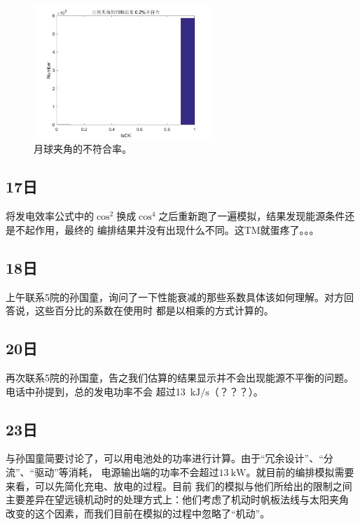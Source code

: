 \begin{figure}
\centering
\includegraphics[width=0.6\textwidth]{figs/check_results/moon_angle_disagreement.png}
\caption{月球夹角的不符合率。}
\label{0411_check_results7}
\end{figure}

\subsection{17日}
将发电效率公式中的$\cos^2$换成$\cos^4$之后重新跑了一遍模拟，结果发现能源条件还是不起作用，最终的
编排结果并没有出现什么不同。这TM就蛋疼了。。。

\subsection{18日}
上午联系5院的孙国童，询问了一下性能衰减的那些系数具体该如何理解。对方回答说，这些百分比的系数在使用时
都是以相乘的方式计算的。

\subsection{20日}
再次联系5院的孙国童，告之我们估算的结果显示并不会出现能源不平衡的问题。电话中孙提到，总的发电功率不会
超过13~$\text{kJ/s}$（？？？）。

\subsection{23日}
与孙国童简要讨论了，可以用电池处的功率进行计算。由于“冗余设计”、“分流”、“驱动”等消耗，
电源输出端的功率不会超过$13~\text{kW}$。就目前的编排模拟需要来看，可以先简化充电、放电的过程。目前
我们的模拟与他们所给出的限制之间主要差异在望远镜机动时的处理方式上：他们考虑了机动时帆板法线与太阳夹角
改变的这个因素，而我们目前在模拟的过程中忽略了“机动”。

